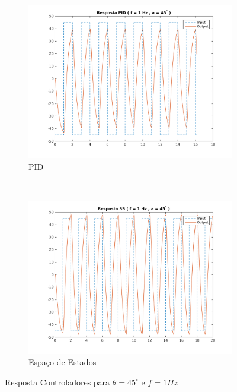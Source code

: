 \documentclass[a4paper,11pt]{article}
\begin{document}
\begin{figure}[H]
    \centering
    \begin{subfigure}[b]{0.5\textwidth}
        \centering
        \includegraphics[width = \linewidth]{tex/img/quanserpid_s45num1.png}
        \caption{PID}
    \end{subfigure}%
    ~ 
    \begin{subfigure}[b]{0.5\textwidth}
        \centering
        \includegraphics[width = \linewidth]{tex/img/quanserss_s45num1.png}
        \caption{Espaço de Estados}
    \end{subfigure}%
    \caption{Resposta Controladores para $\theta=45^\circ$ e $f = 1Hz$}
    \label{fig:control_s45dt1}
\end{figure}
\end{document}
